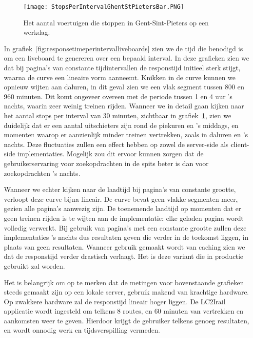 \begin{figure}[h]
	\centering
	\texttt{[image: StopsPerIntervalGhentStPietersBar.PNG]}
	\caption[Het aantal voertuigen die stoppen in Gent-St-Pieters]{Het aantal voertuigen die stoppen in Gent-Sint-Pieters op een werkdag.}
	\label{fig:stopsperintervaldetail}
\end{figure}

In grafiek~\ref{fig:responsetimeperintervalliveboards} zien we de tijd die benodigd is om een liveboard te genereren over een bepaald interval. In deze grafieken zien we dat bij pagina's van constante tijdintervallen de responstijd initieel sterk stijgt, waarna de curve een lineaire vorm aanneemt. Knikken in de curve kunnen we opnieuw wijten aan daluren, in dit geval zien we een vlak segment tussen 800 en 960 minuten. Dit komt ongeveer overeen met de periode tussen 1 en 4 uur 's nachts, waarin zeer weinig treinen rijden. Wanneer we in detail gaan kijken naar het aantal stops per interval van 30 minuten, zichtbaar in grafiek~\ref{fig:stopsperintervaldetail}, zien we duidelijk dat er een aantal uitschieters zijn rond de piekuren en 's middags, en momenten waarop er aanzienlijk minder treinen vertrekken, zoals in daluren en 's nachts. Deze fluctuaties zullen een effect hebben op zowel de server-side als client-side implementaties. Mogelijk zou dit ervoor kunnen zorgen dat de gebruikerservaring voor zoekopdrachten in de spits beter is dan voor zoekopdrachten 's nachts.

Wanneer we echter kijken naar de laadtijd bij pagina's van constante grootte, verloopt deze curve bijna lineair. De curve bevat geen vlakke segmenten meer, gezien alle pagina's aanwezig zijn. De toenemende laadtijd op momenten dat er geen treinen rijden is te wijten aan de implementatie: elke geladen pagina wordt volledig verwerkt. Bij gebruik van pagina's met een constante grootte zullen deze implementaties 's nachts dus resultaten geven die verder in de toekomst liggen, in plaats van geen resultaten. Wanneer gebruik gemaakt wordt van caching zien we dat de responstijd verder drastisch verlaagt. Het is deze variant die in productie gebruikt zal worden. 

Het is belangrijk om op te merken dat de metingen voor bovenstaande grafieken steeds gemaakt zijn op een lokale server, gebruik makend van krachtige hardware. Op zwakkere hardware zal de responstijd lineair hoger liggen. De LC2Irail applicatie wordt ingesteld om telkens 8 routes, en 60 minuten van vertrekken en aankomsten weer te geven. Hierdoor krijgt de gebruiker telkens genoeg resultaten, en wordt onnodig werk en tijdsverspilling vermeden.

